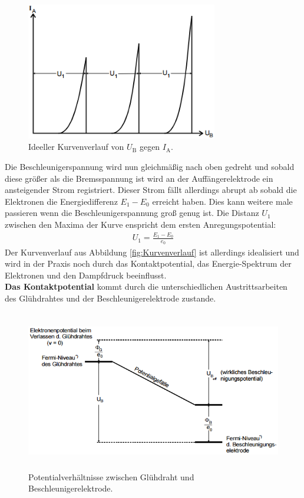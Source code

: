 \begin{figure}[H]
	\centering
	\includegraphics[height=6cm]{picture/Kurvenverlauf}
	\caption{Ideeller Kurvenverlauf von $U_\text{B}$ gegen $I_\text{A}$. \cite[4]{sample}}
	\label{fig:Kurvenverlauf}
\end{figure}

Die Beschleunigerspannung wird nun gleichmäßig nach oben gedreht und sobald diese größer als die Bremsspannung ist wird an der Auffängerelektrode ein ansteigender Strom registriert. Dieser Strom fällt allerdings abrupt ab sobald die Elektronen die Energiedifferenz $E_1 - E_0$ erreicht haben. Dies kann weitere male passieren wenn die Beschleunigerspannung groß genug ist. Die Distanz $U_1$ zwischen den Maxima der Kurve enspricht dem ersten Anregungspotential:
\begin{align}
	U_1 = \frac{E_1 - E_0}{e_0}
\end{align}
Der Kurvenverlauf aus Abbildung \eqref{fig:Kurvenverlauf} ist allerdings idealisiert und wird in der Praxis noch durch das Kontaktpotential, das Energie-Spektrum der Elektronen und den Dampfdruck beeinflusst. \\
\textbf{Das Kontaktpotential} kommt durch die unterschiedlichen Austrittsarbeiten des Glühdrahtes und der Beschleunigerelektrode zustande.

\begin{figure}[H]
	\centering
	\includegraphics[height=7cm]{picture/Kontakt}
	\caption{Potentialverhältnisse zwischen Glühdraht und Beschleunigerelektrode. \cite[5]{sample}}
	\label{fig:Kontakt}
\end{figure}

